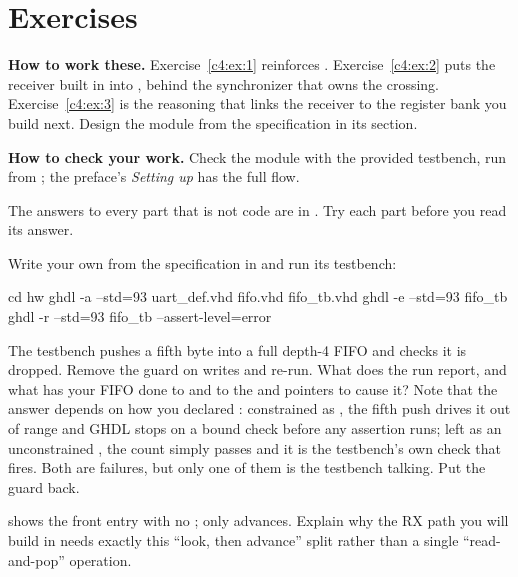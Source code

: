 
\section{Exercises}
\label{c4:sec:exercises}\label{c4:app:b}

\begin{aside}
\textbf{How to work these.} Exercise~\ref{c4:ex:1} reinforces .
Exercise~\ref{c4:ex:2} puts the receiver built in  into , behind the
synchronizer that owns the crossing. Exercise~\ref{c4:ex:3} is the reasoning that links the receiver
to the register bank you build next. Design the module from the specification in its section.

\textbf{How to check your work.} Check the module with the provided testbench, run from ;
the preface's \emph{Setting up} has the full flow.

The answers to every part that is not code are in . Try each part before you read its
answer.
\end{aside}

\label{c4:ex:1}

 Write your own  from the specification in  and run its
testbench:

\begin{shell}
cd hw
ghdl -a --std=93 uart_def.vhd fifo.vhd fifo_tb.vhd
ghdl -e --std=93 fifo_tb
ghdl -r --std=93 fifo_tb --assert-level=error
\end{shell}

 The testbench pushes a fifth byte into a full depth-4 FIFO and checks it is dropped.
Remove the  guard on writes and re-run. What does the run report, and what has your
FIFO done to  and to the  and  pointers to cause it? Note that the
answer depends on how you declared : constrained as , the
fifth push drives it out of range and GHDL stops on a bound check before any assertion runs; left as
an unconstrained , the count simply passes  and it is the testbench's own
check that fires. Both are failures, but only one of them is the testbench talking. Put the guard
back.

  shows the front entry with no ;  only advances. Explain
why the RX path you will build in  needs exactly this ``look, then advance'' split rather
than a single ``read-and-pop'' operation.

